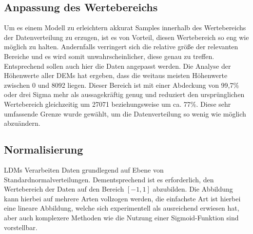 \subsection{Anpassung des Wertebereichs}

Um es einem Modell zu erleichtern akkurat Samples innerhalb des Wertebereichs der Datenverteilung zu erzugen, ist es von Vorteil, diesen Wertebereich so eng wie möglich zu halten. Andernfalls verringert sich die relative größe der relevanten Bereiche und es wird somit unwahrscheinlicher, diese genau zu treffen. Entsprechend sollen auch hier die Daten angepasst werden. 
Die Analyse der Höhenwerte aller DEMs hat ergeben, dass die weitaus meisten Höhenwerte zwischen 0 und 8092 liegen. Dieser Bereich ist mit einer Abdeckung von 99,7\% oder drei Sigma mehr als aussagekräftig genug und reduziert den ursprünglichen Wertebereich gleichzeitig um 27071 beziehungsweise um ca. 77\%. 
Diese sehr umfassende Grenze wurde gewählt, um die Datenverteilung so wenig wie möglich abzuändern.

\subsection{Normalisierung}

\ac{LDM}s Verarbeiten Daten grundlegend auf Ebene von Standardnormalverteilungen. Dementsprechend ist es erforderlich, den Wertebereich der Daten auf den Bereich $\left [ -1, 1\right ]$ abzubilden. Die Abbildung kann hierbei auf mehrere Arten vollzogen werden, die einfachste Art ist hierbei eine lineare Abbildung, welche sich experimentell als ausreichend erwiesen hat, aber auch komplexere Methoden wie die Nutzung einer Sigmoid-Funktion sind vorstellbar. 


